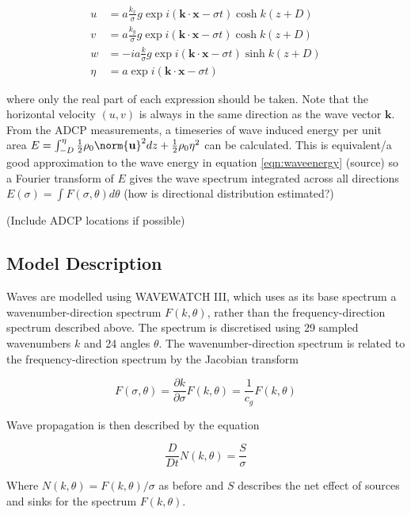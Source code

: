 \begin{align*}
	u &= a \frac {k_x} {\sigma} g \exp{i(\mathbf{k}\cdot\mathbf{x} - \sigma t)} \cosh k(z + D) \\
	v &= a \frac {k_y} {\sigma} g \exp{i(\mathbf{k}\cdot\mathbf{x} - \sigma t)} \cosh k(z + D) \\
	w &= -i a \frac k \sigma g \exp{i(\mathbf{k}\cdot\mathbf{x} - \sigma t)} \sinh k(z + D) \\
	\eta &= a \exp{i(\mathbf{k}\cdot\mathbf{x} - \sigma t)}
\end{align*}

where only the real part of each expression should be taken. Note that the horizontal velocity $(u,v)$ is always in the same direction as the wave vector $\mathbf{k}$. From the ADCP measurements, a timeseries of wave induced energy per unit area $E = \int_{-D}^\eta \frac 1 2 \rho_0 \norm{\mathbf{u}}^2 dz + \frac 1 2 \rho_0 \eta^2$ can be calculated. This is equivalent/a good approximation to the wave energy in equation \ref{eqn:waveenergy} (source) so a Fourier transform of $E$ gives the wave spectrum integrated across all directions $E(\sigma) = \int F(\sigma,\theta) d\theta$ (how is directional distribution estimated?)

(Include ADCP locations if possible)

\subsection{Model Description}

Waves are modelled using WAVEWATCH III, which uses as its base spectrum a wavenumber-direction spectrum $F(k,\theta)$, rather than the frequency-direction spectrum described above. The spectrum is discretised using 29 sampled wavenumbers $k$ and 24 angles $\theta$. The wavenumber-direction spectrum is related to the frequency-direction spectrum by the Jacobian transform

\[
F(\sigma,\theta) = \frac{\partial k}{\partial \sigma}F(k,\theta) = \frac{1}{c_g}F(k,\theta)
\]

Wave propagation is then described by the equation

\begin{equation}
    \frac{D}{Dt}N(k,\theta) = \frac S \sigma
\end{equation}

Where $N(k,\theta) = F(k,\theta)/\sigma$ as before and $S$ describes the net effect of sources and sinks for the spectrum $F(k,\theta)$.

